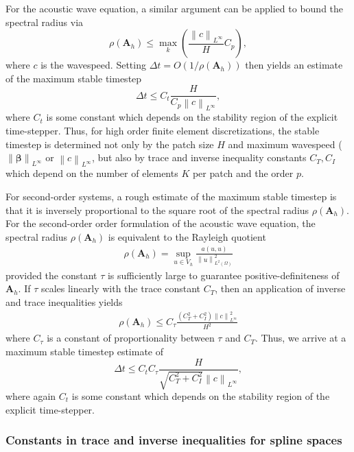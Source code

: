\documentclass[preprint,10pt]{elsarticle}
\newcommand{\nor}[1]{\left\| #1 \right\|}
\newcommand{\LRp}[1]{\left( #1 \right)}
\renewcommand{\L}{L^2\LRp{\Omega}}
\newcommand{\reviewerOne}[1]{#1}
\newcommand{\reviewerTwo}[1]{#1}
\begin{document}
For the acoustic wave equation, a similar argument can be applied to bound the spectral radius via
\[
\rho\LRp{\bm{A}_h} \leq \max_k\LRp{ \frac{\nor{c}_{L^\infty}}{\reviewerOne{H}} C_p},
\]
where $c$ is the wavespeed.  Setting $\Delta t = O(1/\rho\LRp{\bm{A}_h})$ then yields an estimate of the maximum stable timestep 
\[
\Delta t \leq C_t\frac{\reviewerOne{H}}{C_p\nor{c}_{L^\infty} },
\]
\reviewerOne{where $C_t$ is some constant which depends on the stability region of the explicit time-stepper.}
Thus, for high order finite element discretizations, the stable timestep is determined not only by the \reviewerOne{patch} size $\reviewerOne{H}$ and maximum wavespeed ($\nor{\bm{\beta}}_{L^{\infty}}$ or $\nor{c}_{L^\infty}$, but also by trace and inverse inequality constants $C_T, C_I$ \reviewerOne{which depend on the number of elements $K$ per patch and the order $p$}.

\reviewerTwo{For second-order systems, a rough estimate of the maximum stable timestep is that it is inversely proportional to the square root of the spectral radius $\rho(\bm{A}_h)$.  For the second-order order formulation of the acoustic wave equation, the spectral radius $\rho(\bm{A}_h)$ is equivalent to the Rayleigh quotient
\begin{align*}
\rho(\bm{A}_h) = \sup_{u \in V_h} \frac{a(u,u)}{\nor{u}^2_{\L}}
\end{align*}
provided the constant $\tau$ is sufficiently large to guarantee positive-definiteness of $\bm{A}_h$.  If $\tau$ scales linearly with the trace constant $C_T$, then an application of inverse and trace inequalities yields
\begin{align*}
\rho(\bm{A}_h) \leq C_{\tau} \frac{\left( C_T^2 + C_I^2 \right) \nor{c}^2_{L^\infty}}{H^2}
\end{align*}
where $C_{\tau}$ is a constant of proportionality between $\tau$ and $C_T$.  Thus, we arrive at a maximum stable timestep estimate of
\[
\Delta t \leq C_t C_\tau\frac{H}{ \sqrt{C_T^2 + C_I^2} \nor{c}_{L^\infty} },
\]
where again $C_t$ is some constant which depends on the stability region of the explicit time-stepper.}

\subsubsection{Constants in trace and inverse inequalities for spline spaces}
\end{document}
